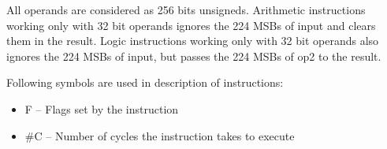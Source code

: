 \documentclass[notconfidential]{tropic_design_spec}
\begin{document}

All operands are considered as 256 bits unsigneds. Arithmetic instructions working only with 32 bit
operands ignores the 224 MSBs of input and clears them in the result. Logic instructions
working only with 32 bit operands also ignores the 224 MSBs of input, but passes the 224 MSBs of op2
to the result.





Following symbols are used in description of instructions:
\begin{itemize}
    \item{F -- Flags set by the instruction}
    \item{\#C -- Number of cycles the instruction takes to execute}
\end{itemize}
\end{document}

